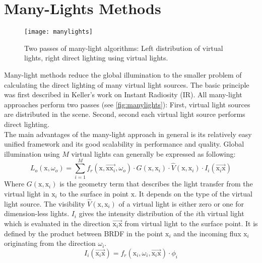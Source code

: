 \documentclass[thesis.tex]{subfiles}
\begin{document}
\section {Many-Lights Methods} \label{sec:prev:manylights}
\begin{figure}[h]
	\centering
	\texttt{[image: manylights]}
	\caption{\cite{bib:manylightssurvey2014} Two passes of many-light algorithms: Left distribution of virtual lights, right direct lighting using virtual lights.} \label{fig:manylights}
\end{figure}
Many-light methods reduce the global illumination to the smaller problem of calculating the direct lighting of many virtual light sources.
The basic principle was first described in Keller's work on Instant Radiosity \cite{bib:instantradiosity} (IR).
All many-light approaches perform two passes (see \autoref{fig:manylights}):
First, virtual light sources are distributed in the scene.
Second, second each virtual light source performs direct lighting.
\\
The main advantages of the many-light approach in general is its relatively easy unified framework and its good scalability in performance and quality.
Global illumination using $M$ virtual lights can generally be expressed as following:
\begin{equation}
L_o(\mathrm{x}, \omega_o) = \sum\limits_{i=1}^{M} f_r(\mathrm{x}, \overrightarrow{\mathrm{x}\mathrm{x}_i}, \omega_o) \cdot G(\mathrm{x}, \mathrm{x}_i) \cdot \hat{V}(\mathrm{x}, \mathrm{x}_i) \cdot I_i(\overrightarrow{\mathrm{x}_i\mathrm{x}})
\end{equation}
Where $G(\mathrm{x}, \mathrm{x}_i)$ is the geometry term that describes the light transfer from the virtual light in $\mathrm{x}_i$ to the surface in point $\mathrm{x}$.
It depends on the type of the virtual light source.
The visibility $\hat{V}(\mathrm{x}, \mathrm{x}_i)$ of a virtual light is either zero or one for dimension-less lights. %
$I_i$ gives the intensity distribution of the $i$th virtual light which is evaluated in the direction $\overrightarrow{\mathrm{x}_i\mathrm{x}}$ from virtual light to the surface point.
It is defined by the product between BRDF in the point $\mathrm{x}_i$ and the incoming flux $\mathrm{x}_i$ originating from the direction $\omega_i$.
\begin{equation}
I_i(\overrightarrow{\mathrm{x}_i\mathrm{x}}) = f_r(\mathrm{x}_i, \omega_i, \overrightarrow{\mathrm{x}_i\mathrm{x}}) \cdot \phi_i
\end{equation}
 
\end{document}

